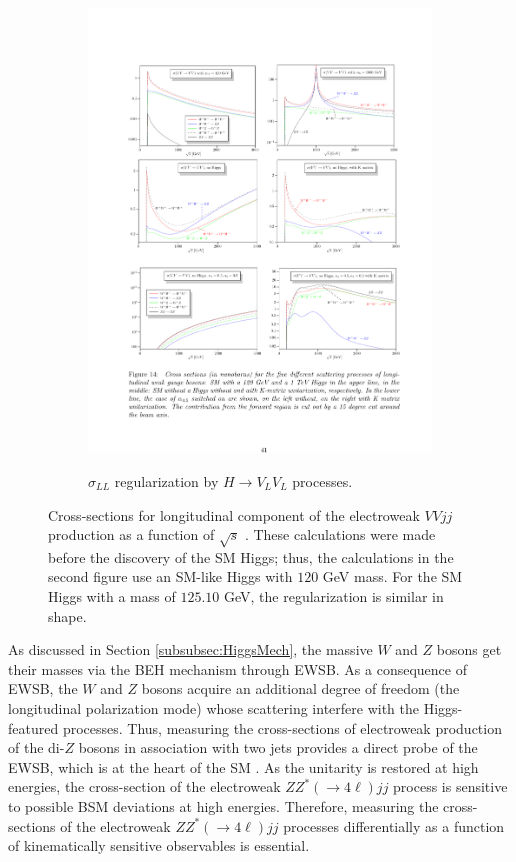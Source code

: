 \begin{figure}[!htb]
\begin{subfigure}{.49\textwidth}
    \includegraphics[width=.99\linewidth]{figures/Theory/VBS_WithHiggs.pdf}  \\
    \caption{$\sigma_{LL}$ regularization by $H\rightarrow V_L V_L$ processes.}
    \label{fig:SM_XS}
  \end{subfigure}
  \caption{ Cross-sections for longitudinal component of the electroweak $VVjj$ production as a function of $\sqrt{s}$ \label{fig:SM_EWK_ZZjj_XS} \cite{VBSDiagrams}. These calculations were made before the discovery of the SM Higgs; thus, the calculations in the second figure use an SM-like Higgs with $120$ GeV mass. For the SM Higgs with a mass of $125.10$ GeV, the regularization is similar in shape. }
\end{figure}

As discussed in Section \ref{subsubsec:HiggsMech}, the massive $W$ and $Z$ bosons get their masses via the BEH mechanism through EWSB. As a consequence of EWSB, the $W$ and $Z$ bosons acquire an additional degree of freedom (the longitudinal polarization mode) whose scattering interfere with the Higgs-featured processes. Thus, measuring the cross-sections of electroweak production of the di-$Z$ bosons in association with two jets provides a direct probe of the EWSB, which is at the heart of the SM \cite{CMSRun2ZZjj}. As the unitarity is restored at high energies, the cross-section of the electroweak $ZZ^*(\rightarrow 4\ell) jj$ process is sensitive to possible BSM deviations at high energies. Therefore, measuring the cross-sections of the electroweak $ZZ^*(\rightarrow 4\ell) jj$ processes differentially as a function of kinematically sensitive observables is essential. 

